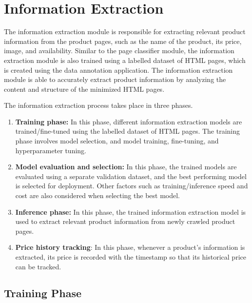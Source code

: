 \section{Information Extraction}\label{sec:information_extraction}

The information extraction module is responsible for extracting relevant product information from the product pages, such as the name of the product, its price, image, and availability.
Similar to the page classifier module, the information extraction module is also trained using a labelled dataset of HTML pages, which is created using the data annotation application.
The information extraction module is able to accurately extract product information by analyzing the content and structure of the minimized HTML pages.

The information extraction process takes place in three phases.
\begin{enumerate}
    \item \textbf{Training phase:} In this phase, different information extraction models are trained/fine-tuned using the labelled dataset of HTML pages.
    The training phase involves model selection, and model training, fine-tuning, and hyperparameter tuning.
    \item \textbf{Model evaluation and selection:} In this phase, the trained models are evaluated using a separate validation dataset, and the best performing model is selected for deployment.
    Other factors such as training/inference speed and cost are also considered when selecting the best model.
    \item \textbf{Inference phase:} In this phase, the trained information extraction model is used to extract relevant product information from newly crawled product pages.
    \item \textbf{Price history tracking}: In this phase, whenever a product's information is extracted, its price is recorded with the timestamp so that its historical price can be tracked.
\end{enumerate}

\subsection{Training Phase}\label{subsec:information_extraction_training_phase}

